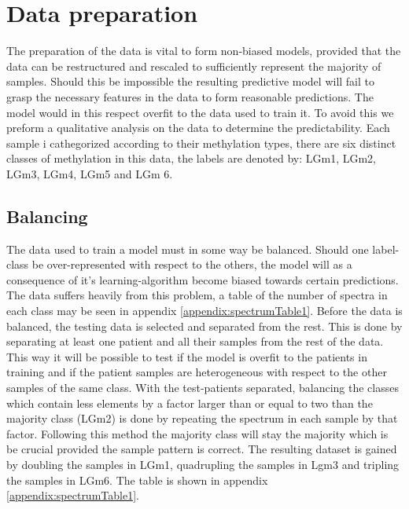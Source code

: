 \section{Data preparation}
The preparation of the data is vital to form non-biased models, provided that the data can be restructured and rescaled to sufficiently represent the majority of samples. Should this be impossible the resulting predictive model will fail to grasp the necessary features in the data to form reasonable predictions. The model would in this respect overfit to the data used to train it. To avoid this we preform a qualitative analysis on the data to determine the predictability. Each sample i cathegorized according to their methylation types, there are six distinct classes of methylation in this data, the labels are denoted by: LGm1, LGm2, LGm3, LGm4, LGm5 and LGm 6.

\subsection{Balancing}
The data used to train a model must in some way be balanced. Should one label-class be over-represented with respect to the others, the model will as a consequence of it's learning-algorithm become biased towards certain predictions. The data suffers heavily from this problem, a table of the number of spectra in each class may be seen in appendix \ref{appendix:spectrumTable1}. Before the data is balanced, the testing data is selected and separated from the rest. This is done by separating at least one patient and all their samples from the rest of the data. This way it will be possible to test if the model is overfit to the patients in training and if the patient samples are heterogeneous  with respect to the other samples of the same class. With the test-patients separated, balancing the classes which contain less elements by a factor larger than or equal to two than the majority class (LGm2) is done by repeating the spectrum in each sample by that factor. Following this method the majority class will stay the majority which is be crucial provided the sample pattern is correct. The resulting dataset is gained by doubling the samples in LGm1, quadrupling the samples in Lgm3 and tripling the samples in LGm6. The table is shown in appendix \ref{appendix:spectrumTable1}.
